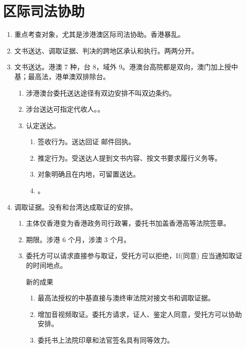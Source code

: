 \section{区际司法协助}
\begin{enumerate}
  \item 重点考查对象，尤其是涉港澳区际司法协助。香港暴乱。
  \item 文书送达、调取证据、判决的跨地区承认和执行。两两分开。
  \item 文书送达。港澳 7 种，台 8，域外 9。港澳台高院都是双向，澳门加上授中基；最高法，港单澳双排除台。
        \begin{enumerate}
          \item 涉港澳台委托送达途径有双边安排不叫双边条约。
          \item 涉台送达可指定代收人。。
          \item 认定送达。
                \begin{enumerate}
                  \item 签收行为。送达回证 \hz 邮件回执。
                  \item 推定行为。受送达人提到文书内容、按文书要求履行义务等。
                  \item 对象明确且在内地，可留置送达。
                  \item {}。
                \end{enumerate}
        \end{enumerate}
  \item 调取证据。没有和台湾达成取证的安排。
        \begin{enumerate}
          \item 主体仅香港变为香港政务司行政署，委托书加盖香港高等法院签章。
          \item 期限。涉港 6 个月，涉澳 3 个月。
          \item 委托方可以请求直接参与取证，受托方可以拒绝，If(同意) \yjt 应当通知取证的时间地点。
                \begin{kk}{新的成果}
                  \begin{enumerate}
                    \item 最高法授权的中基直接与澳终审法院对接文书和调取证据。
                    \item 增加音视频取证。委托方请求，证人、鉴定人同意，受托方可以协助安排。
                    \item 委托书上法院印章和法官签名具有同等效力。

\end{enumerate}
\end{kk}
\end{enumerate}
\end{enumerate}
